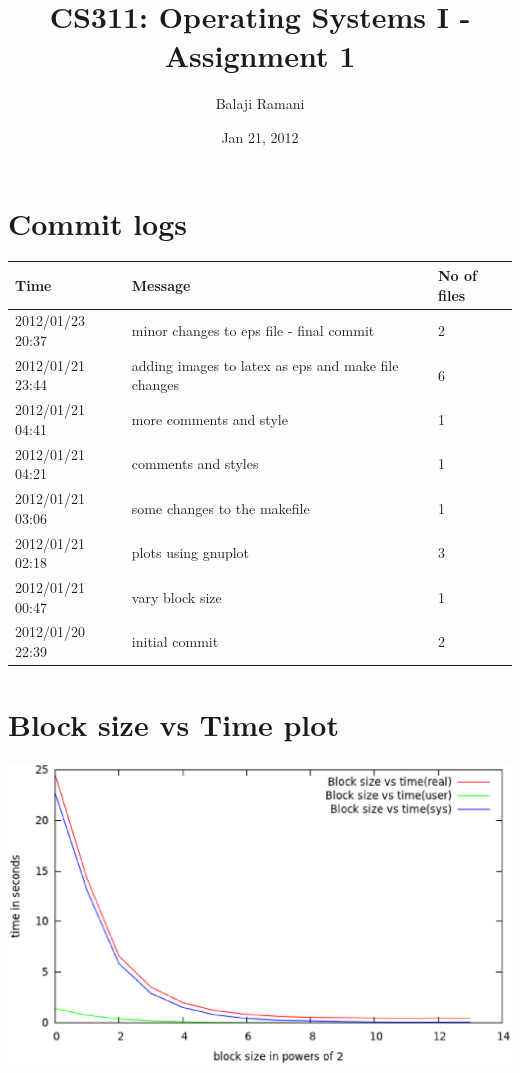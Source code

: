 \documentclass[letterpaper,10pt,twocolumn,titlepage]{article}
\begin{document}
\title{CS311: Operating Systems I - Assignment 1}
\author{Balaji Ramani}
\date{Jan 21, 2012}
\maketitle
\section{Commit logs}
\begin{center}
  \begin{tabular}{ | l | l | l | }
    \hline
    Time & Message & No of files \\ \hline
	2012/01/23 20:37 & minor changes to eps file - final
commit & 2 \\ \hline
    2012/01/21 23:44 & adding images to latex as eps and make
file changes & 6 \\ \hline
    2012/01/21 04:41 & more comments and style & 1 \\ \hline
    2012/01/21 04:21 & comments and styles & 1 \\ \hline
    2012/01/21 03:06 & some changes to the makefile & 1 \\
\hline
    2012/01/21 02:18 & plots using gnuplot & 3 \\ \hline
    2012/01/21 00:47 & vary block size & 1 \\ \hline
    2012/01/20 22:39 & initial commit & 2 \\ \hline
  \end{tabular}
\end{center}
\section{Block size vs Time plot}
\begin{center}
        \includegraphics[scale=0.7]{graph.eps}
\end{center}
\end{document}
